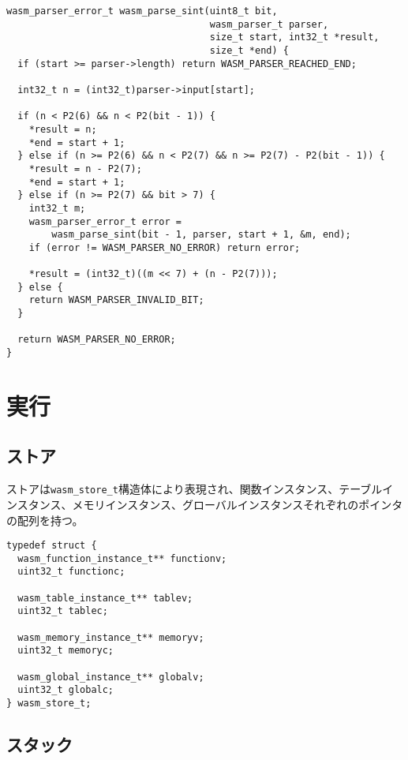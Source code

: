 \begin{lstlisting}[caption=符号付き整数（sLEB128形式）のパース,label=lst:parse_sleb128]
wasm_parser_error_t wasm_parse_sint(uint8_t bit,
                                    wasm_parser_t parser,
                                    size_t start, int32_t *result,
                                    size_t *end) {
  if (start >= parser->length) return WASM_PARSER_REACHED_END;

  int32_t n = (int32_t)parser->input[start];

  if (n < P2(6) && n < P2(bit - 1)) {
    *result = n;
    *end = start + 1;
  } else if (n >= P2(6) && n < P2(7) && n >= P2(7) - P2(bit - 1)) {
    *result = n - P2(7);
    *end = start + 1;
  } else if (n >= P2(7) && bit > 7) {
    int32_t m;
    wasm_parser_error_t error =
        wasm_parse_sint(bit - 1, parser, start + 1, &m, end);
    if (error != WASM_PARSER_NO_ERROR) return error;

    *result = (int32_t)((m << 7) + (n - P2(7)));
  } else {
    return WASM_PARSER_INVALID_BIT;
  }

  return WASM_PARSER_NO_ERROR;
}
\end{lstlisting}

\section{実行}

\subsection{ストア}

ストアは\verb|wasm_store_t|構造体により表現され、関数インスタンス、テーブルインスタンス、メモリインスタンス、グローバルインスタンスそれぞれのポインタの配列を持つ。

\begin{lstlisting}[caption=ストアの定義,label=lst:parse_sleb128]
typedef struct {
  wasm_function_instance_t** functionv;
  uint32_t functionc;

  wasm_table_instance_t** tablev;
  uint32_t tablec;

  wasm_memory_instance_t** memoryv;
  uint32_t memoryc;

  wasm_global_instance_t** globalv;
  uint32_t globalc;
} wasm_store_t;
\end{lstlisting}

\subsection{スタック}

